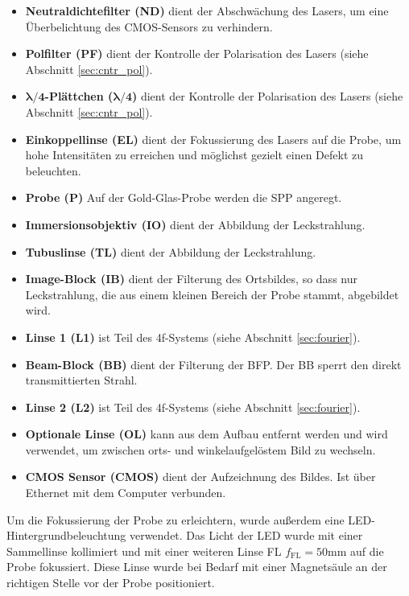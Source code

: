 \documentclass[titlepage,  ngerman]{article}
\begin{document}
		\begin{itemize}
			\item \textbf{Neutraldichtefilter (ND)} dient der Abschwächung des Lasers, um eine Überbelichtung des CMOS-Sensors zu verhindern.
			\item \textbf{Polfilter (PF)} dient der Kontrolle der Polarisation des Lasers (siehe Abschnitt \ref{sec:cntr_pol}).
			\item $\boldsymbol{\lambda / 4}$\textbf{-Plättchen (}$\boldsymbol{\lambda / 4}$\textbf{)} dient der Kontrolle der Polarisation des Lasers (siehe Abschnitt \ref{sec:cntr_pol}).
			\item \textbf{Einkoppellinse (EL)} dient der Fokussierung des Lasers auf die Probe, um hohe Intensitäten zu erreichen und möglichst gezielt einen Defekt zu beleuchten.
			\item \textbf{Probe (P)} Auf der Gold-Glas-Probe werden die SPP angeregt.
			\item \textbf{Immersionsobjektiv (IO)} dient der Abbildung der Leckstrahlung.
			\item \textbf{Tubuslinse (TL)} dient der Abbildung der Leckstrahlung.
			\item \textbf{Image-Block (IB)} dient der Filterung des Ortsbildes, so dass nur Leckstrahlung, die aus einem kleinen Bereich der Probe stammt, abgebildet wird.			
			\item \textbf{Linse 1 (L1)} ist Teil des 4f-Systems (siehe Abschnitt \ref{sec:fourier}).
			\item \textbf{Beam-Block (BB)} dient der Filterung der BFP. Der BB sperrt den direkt transmittierten Strahl.			
			\item \textbf{Linse 2 (L2)} ist Teil des 4f-Systems (siehe Abschnitt \ref{sec:fourier}).
			\item \textbf{Optionale Linse (OL)} kann aus dem Aufbau entfernt werden und wird verwendet, um zwischen orts- und winkelaufgelöstem Bild zu wechseln.
			\item \textbf{CMOS Sensor (CMOS)}  dient der Aufzeichnung des Bildes. Ist über Ethernet mit dem Computer verbunden.			
		\end{itemize}
		Um die Fokussierung der Probe zu erleichtern, wurde außerdem eine LED-Hintergrundbeleuchtung verwendet. Das Licht der LED wurde mit einer Sammellinse kollimiert und mit einer weiteren Linse FL $f_{\mathrm{FL}}=50\mathrm{mm}$ auf die  Probe fokussiert. Diese Linse wurde bei Bedarf mit einer Magnetsäule an der richtigen Stelle vor der Probe positioniert.
		
\end{document}
